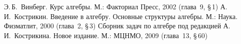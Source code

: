 \documentclass[a4paper,10pt]{amsart}
\def\ZZ{{\mathbb Z}}%
\newtheorem{corollary}{Следствие}
\theoremstyle{definition}
\theoremstyle{remark}
\newtheorem{remark}{Замечание}
\begin{document}
%
%
%



\bigskip

\begin{thebibliography}{99}
Э.\,Б.~Винберг. Курс алгебры. М.: Факториал Пресс, 2002 (глава~9,
\S\,1)
А.\,И.~Кострикин. Введение в алгебру. Основные структуры алгебры.
М.: Наука. Физматлит, 2000 (глава~2, \S\,3)
Сборник задач по алгебре под редакцией А.\,И.~Кострикина. Новое
издание. М.: МЦНМО, 2009 (глава~13, \S\,60)
\end{thebibliography}
\end{document}
